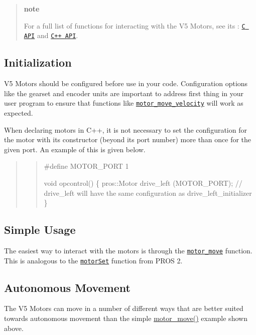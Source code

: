 \begin{quote}
{\bfseries note}

For a full list of functions for interacting with the V5 Motors, see its \+: \href{../../api/c/motors.html}{\tt C A\+PI} and \href{../../api/cpp/motors.html}{\tt C++ A\+PI}. \end{quote}


\subsection*{Initialization}

V5 Motors should be configured before use in your code. Configuration options like the gearset and encoder units are important to address first thing in your user program to ensure that functions like \href{../../api/c/motors.html#motor-move-velocity}{\tt motor\+\_\+move\+\_\+velocity} will work as expected.

When declaring motors in C++, it is not necessary to set the configuration for the motor with its constructor (beyond its port number) more than once for the given port. An example of this is given below.

\begin{quote}
\begin{quote}

\begin{DoxyCode}
#define MOTOR\_PORT 1

void opcontrol() \{
  pros::Motor drive\_left (MOTOR\_PORT);
  // drive\_left will have the same configuration as drive\_left\_initializer
\}
\end{DoxyCode}
 \end{quote}
\end{quote}


\subsection*{Simple Usage}

The easiest way to interact with the motors is through the \href{../../api/c/motors.html#motor-move}{\tt motor\+\_\+move} function. This is analogous to the \href{../../../cortex/api/index.html#motorSet}{\tt motor\+Set} function from P\+R\+OS 2.

\subsection*{Autonomous Movement}

The V5 Motors can move in a number of different ways that are better suited towards autonomous movement than the simple {\ttfamily \hyperlink{motors_8h_a7da9bf1e229e50bfeeaecf026a6d0d08}{motor\+\_\+move()}} example shown above.

